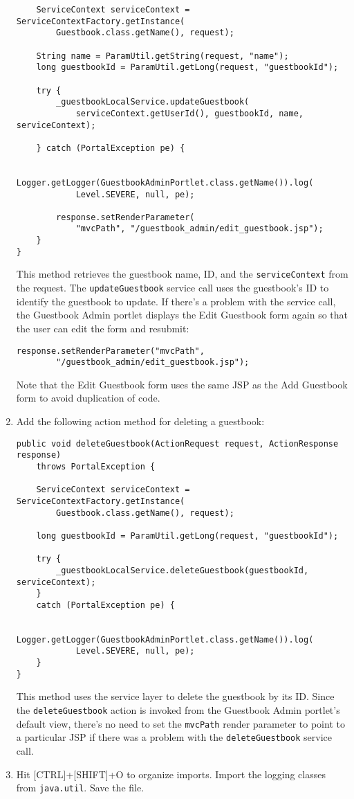 \begin{enumerate}
\begin{verbatim}
    ServiceContext serviceContext = ServiceContextFactory.getInstance(
        Guestbook.class.getName(), request);

    String name = ParamUtil.getString(request, "name");
    long guestbookId = ParamUtil.getLong(request, "guestbookId");

    try {
        _guestbookLocalService.updateGuestbook(
            serviceContext.getUserId(), guestbookId, name, serviceContext);

    } catch (PortalException pe) {

        Logger.getLogger(GuestbookAdminPortlet.class.getName()).log(
            Level.SEVERE, null, pe);

        response.setRenderParameter(
            "mvcPath", "/guestbook_admin/edit_guestbook.jsp");
    }
}
\end{verbatim}

  This method retrieves the guestbook name, ID, and the
  \texttt{serviceContext} from the request. The \texttt{updateGuestbook}
  service call uses the guestbook's ID to identify the guestbook to
  update. If there's a problem with the service call, the Guestbook
  Admin portlet displays the Edit Guestbook form again so that the user
  can edit the form and resubmit:

\begin{verbatim}
response.setRenderParameter("mvcPath",
        "/guestbook_admin/edit_guestbook.jsp");
\end{verbatim}

  Note that the Edit Guestbook form uses the same JSP as the Add
  Guestbook form to avoid duplication of code.
\item
  Add the following action method for deleting a guestbook:

\begin{verbatim}
public void deleteGuestbook(ActionRequest request, ActionResponse response)
    throws PortalException {

    ServiceContext serviceContext = ServiceContextFactory.getInstance(
        Guestbook.class.getName(), request);

    long guestbookId = ParamUtil.getLong(request, "guestbookId");

    try {
        _guestbookLocalService.deleteGuestbook(guestbookId, serviceContext);
    }
    catch (PortalException pe) {

        Logger.getLogger(GuestbookAdminPortlet.class.getName()).log(
            Level.SEVERE, null, pe);
    }
}
\end{verbatim}

  This method uses the service layer to delete the guestbook by its ID.
  Since the \texttt{deleteGuestbook} action is invoked from the
  Guestbook Admin portlet's default view, there's no need to set the
  \texttt{mvcPath} render parameter to point to a particular JSP if
  there was a problem with the \texttt{deleteGuestbook} service call.
\item
  Hit {[}CTRL{]}+{[}SHIFT{]}+O to organize imports. Import the logging
  classes from \texttt{java.util}. Save the file.
\end{enumerate}

